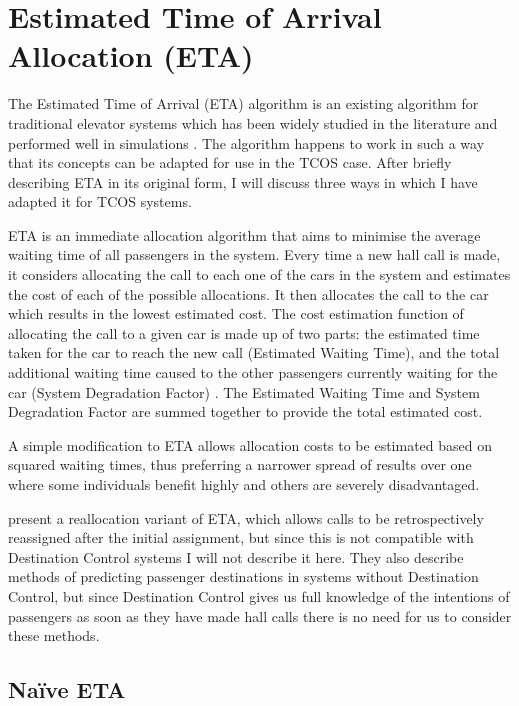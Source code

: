 \documentclass{UoYCSproject}
\begin{document}
\section{Estimated Time of Arrival Allocation (ETA)}
\label{algETAdescription}

The Estimated Time of Arrival (ETA) algorithm is an existing algorithm for traditional elevator systems which has been widely studied in the literature \citep{Rong2003, Nikovski2003} and performed well in simulations \citep{Rong2003}.  The algorithm happens to work in such a way that its concepts can be adapted for use in the TCOS case.  After briefly describing ETA in its original form, I will discuss three ways in which I have adapted it for TCOS systems.

ETA is an immediate allocation algorithm that aims to minimise the average waiting time of all passengers in the system.  Every time a new hall call is made, it considers allocating the call to each one of the cars in the system and estimates the cost of each of the possible allocations.  It then allocates the call to the car which results in the lowest estimated cost.  The cost estimation function of allocating the call to a given car is made up of two parts: the estimated time taken for the car to reach the new call (Estimated Waiting Time), and the total additional waiting time caused to the other passengers currently waiting for the car (System Degradation Factor) \citep{Rong2003}.  The Estimated Waiting Time and System Degradation Factor are summed together to provide the total estimated cost.

A simple modification to ETA allows allocation costs to be estimated based on squared waiting times, thus preferring a narrower spread of results over one where some individuals benefit highly and others are severely disadvantaged.

\citet{Rong2003} present a reallocation variant of ETA, which allows calls to be retrospectively reassigned after the initial assignment, but since this is not compatible with Destination Control systems I will not describe it here.  They also describe methods of predicting passenger destinations in systems without Destination Control, but since Destination Control gives us full knowledge of the intentions of passengers as soon as they have made hall calls there is no need for us to consider these methods.

\subsection{Na\"{i}ve ETA}
\end{document}
